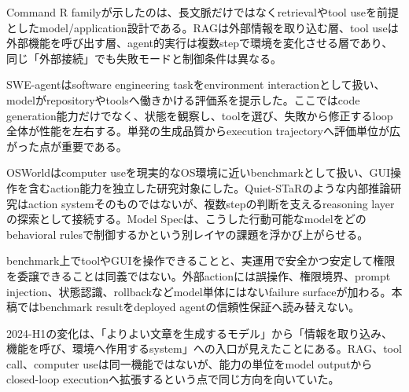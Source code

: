 
Command R familyが示したのは、長文脈だけではなくretrievalやtool useを前提としたmodel/application設計である。RAGは外部情報を取り込む層、tool useは外部機能を呼び出す層、agent的実行は複数stepで環境を変化させる層であり、同じ「外部接続」でも失敗モードと制御条件は異なる。\autocite{src-77e35e5f22be}


SWE-agentはsoftware engineering taskをenvironment interactionとして扱い、modelがrepositoryやtoolsへ働きかける評価系を提示した。ここではcode generation能力だけでなく、状態を観察し、toolを選び、失敗から修正するloop全体が性能を左右する。単発の生成品質からexecution trajectoryへ評価単位が広がった点が重要である。\autocite{src-1c9f1d22c176}


OSWorldはcomputer useを現実的なOS環境に近いbenchmarkとして扱い、GUI操作を含むaction能力を独立した研究対象にした。Quiet-STaRのような内部推論研究はaction systemそのものではないが、複数stepの判断を支えるreasoning layerの探索として接続する。Model Specは、こうした行動可能なmodelをどのbehavioral rulesで制御するかという別レイヤの課題を浮かび上がらせる。\autocite{src-12fa04e64d24,src-70b5d4b3bedd,src-d1406200c99e}


\begin{claimboundary}
benchmark上でtoolやGUIを操作できることと、実運用で安全かつ安定して権限を委譲できることは同義ではない。外部actionには誤操作、権限境界、prompt injection、状態認識、rollbackなどmodel単体にはないfailure surfaceが加わる。本稿ではbenchmark resultをdeployed agentの信頼性保証へ読み替えない。\autocite{src-1c9f1d22c176,src-2f7e28810d05,src-70b5d4b3bedd,src-77e35e5f22be,src-edd253654067}
\end{claimboundary}

2024-H1の変化は、「よりよい文章を生成するモデル」から「情報を取り込み、機能を呼び、環境へ作用するsystem」への入口が見えたことにある。RAG、tool call、computer useは同一機能ではないが、能力の単位をmodel outputからclosed-loop executionへ拡張するという点で同じ方向を向いていた。\autocite{src-1c9f1d22c176,src-70b5d4b3bedd,src-77e35e5f22be,src-d1406200c99e}
